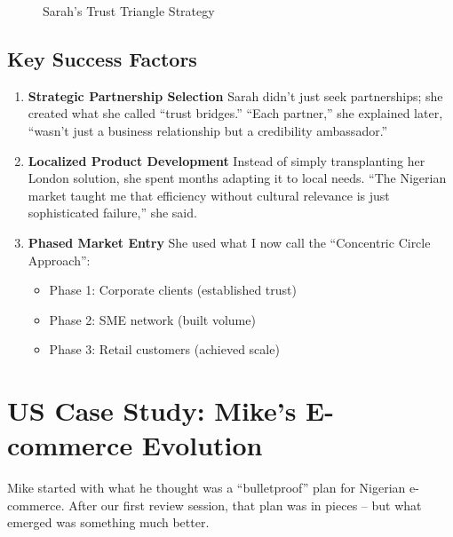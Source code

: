 \begin{figure}[h]
    \centering
    \caption{Sarah's Trust Triangle Strategy}\label{fig:trust-triangle}
\end{figure}

\subsection{Key Success Factors}\label{subsec:key-success-factors}
\begin{enumerate}
    \item \textbf{Strategic Partnership Selection}
    Sarah didn't just seek partnerships; she created what she called ``trust bridges.'' ``Each partner,'' she explained later, ``wasn't just a business relationship but a credibility ambassador.''

    \item \textbf{Localized Product Development}
    Instead of simply transplanting her London solution, she spent months adapting it to local needs. ``The Nigerian market taught me that efficiency without cultural relevance is just sophisticated failure,'' she said.

    \item \textbf{Phased Market Entry}
    She used what I now call the ``Concentric Circle Approach'':
    \begin{itemize}
        \item Phase 1: Corporate clients (established trust)
        \item Phase 2: SME network (built volume)
        \item Phase 3: Retail customers (achieved scale)
    \end{itemize}
\end{enumerate}

\section{US Case Study: Mike's E-commerce Evolution}\label{sec:us-case-study:-mike's-e-commerce-evolution}

Mike started with what he thought was a ``bulletproof'' plan for Nigerian e-commerce. After our first review session, that plan was in pieces – but what emerged was something much better.

